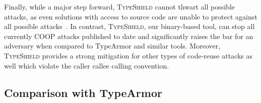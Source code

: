 Finally, while a major step forward, \textsc{TypeShield} cannot thwart all possible attacks, as even solutions with access to source 
code are unable to protect against all possible attacks~\cite{carlini:bending}. In contrast, \textsc{TypeShield}, our binary-based tool, 
can stop all currently COOP attacks published to date and significantly raises the bar for an adversary when compared to
TypeArmor and similar tools. Moreover, \textsc{TypeShield} provides a strong mitigation for other types of code-reuse attacks as well
which violate the caller callee calling convention.

\subsection{Comparison with TypeArmor}
\label{section:comptype}


